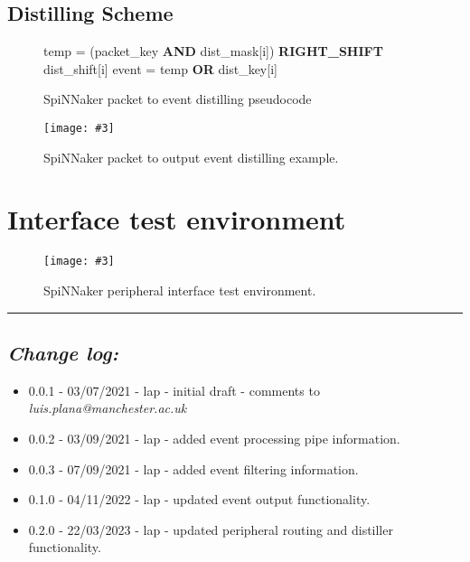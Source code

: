 \documentclass[11pt,a4paper,twoside]{article}
\newcommand{\image}[5][]
{
\begin{figure}[#2]
   \begin{center}
      \texttt{[image: \#3]}
      \caption{#5}
      \label{fig:#4}
   \end{center}
\end{figure}
}
\begin{document}
\vspace{5mm}
\subsection{Distilling Scheme}


\begin{figure}[!ht]
	\centering
	\begin{minipage}{\columnwidth}
		\begin{algorithm}[H]
			\caption{SpiNNaker packet to event distilling pseudocode}
			\begin{algorithmic}[1]
						\State temp = (packet\_key \textbf{AND} dist\_mask[i]) \textbf{RIGHT\_SHIFT} dist\_shift[i]
						\State event = temp \textbf{OR} dist\_key[i]
					\EndIf
				\EndFor
			\end{algorithmic}
			\label{alg:distiller}
		\end{algorithm}
	\end{minipage}
\end{figure}


\image[width = 0.9 \textwidth]{!h}{dist_ex}{fig:dist_fig}
{SpiNNaker packet to output event distilling example.}



\clearpage
\section{Interface test environment}


\image[width = 0.8 \textwidth]{!h}{spif_test_env}{fig:spif_test}
{SpiNNaker peripheral interface test environment.}


\vspace*{1.0cm}
\par\noindent\rule{\linewidth}{2pt}


\subsection*{\itshape Change log:}


\begin{itemize}
	 mm 
	\item 0.0.1 - 03/07/2021 - lap - initial draft - comments to {\itshape luis.plana@manchester.ac.uk}
	\item 0.0.2 - 03/09/2021 - lap - added event processing pipe information.
	\item 0.0.3 - 07/09/2021 - lap - added event filtering information.
	\item 0.1.0 - 04/11/2022 - lap - updated event output functionality.
	\item 0.2.0 - 22/03/2023 - lap - updated peripheral routing and distiller functionality.
\end{itemize}
\end{document}
